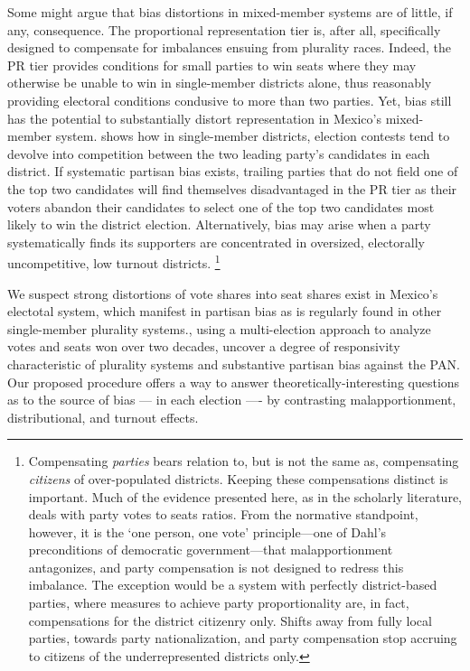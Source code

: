 \documentclass[letter,12pt]{article}
\begin{document}
Some might argue that bias distortions in mixed-member systems are of little, if any, consequence. The proportional representation tier is, after all, specifically designed to compensate for imbalances ensuing from plurality races. Indeed, the PR tier provides conditions for small parties to win seats where they may otherwise be unable to win in single-member districts alone, thus reasonably providing electoral conditions condusive to more than two parties. Yet, bias still has the potential to substantially distort representation in Mexico's mixed-member system. \citet{cox.1997} shows how in single-member districts, election contests tend to devolve into competition between the two leading party's candidates in each district. If systematic partisan bias exists, trailing parties that do not field one of the top two candidates will find themselves disadvantaged in the PR tier as their voters abandon their candidates to select one of the top two candidates most likely to win the district election. Alternatively, bias may arise when a party systematically finds its supporters are concentrated in oversized, electorally uncompetitive, low turnout districts. \footnote{Compensating \emph{parties} bears relation to, but is not the same as, compensating \emph{citizens} of over-populated districts. Keeping these compensations distinct is important. Much of the evidence presented here, as in the scholarly literature, deals with party votes to seats ratios. From the normative standpoint, however, it is the `one person, one vote' principle---one of Dahl's \citeyearpar{dahl.1972} preconditions of democratic government---that malapportionment antagonizes, and party compensation is not designed to redress this imbalance. The exception would be a system with perfectly district-based parties, where measures to achieve party proportionality are, in fact, compensations for the district citizenry only. Shifts away from fully local parties, towards party nationalization, and party compensation stop accruing to citizens of the underrepresented districts only.} 

We suspect strong distortions of vote shares into seat shares exist in Mexico's electotal system, which manifest in partisan bias as is regularly found in other single-member plurality systems.\citet{marquez2014biasBlog}, using a multi-election approach to analyze votes and seats won over two decades, uncover a degree of responsivity characteristic of plurality systems and substantive partisan bias against the PAN. Our proposed procedure offers a way to answer theoretically-interesting questions as to the source of bias --- in each election ---- by contrasting malapportionment, distributional, and turnout effects. 
\end{document}
